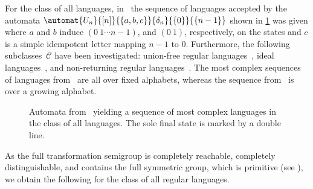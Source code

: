 For the class of all languages, in~\cite{DBLP:journals/ijfcs/Brzozowski13} the sequence of languages accepted
by the automata $\automat{U_n}{[n]}{\{a,b,c\}}{\delta_n}{\{0\}}{\{n-1\}}$
shown in \cref{syncmax:fig:most-complex-all-lang} was given
where $a$ and $b$ induce $(0 ~ 1 \cdots n - 1)$,
and $(0 ~ 1)$, respectively, on the states
and $c$ is a simple idempotent letter mapping $n-1$ to $0$.
Furthermore, the following subclasses~$\mathcal C$ have
been investigated: union-free regular languages~\cite{DBLP:conf/dcfs/BrzozowskiD18},
ideal languages~\cite{DBLP:journals/dmtcs/BrzozowskiDL16}, and non-returning regular languages~\cite{brzozowski2019most}.
The most complex sequences of languages from~\cite{DBLP:journals/ijfcs/Brzozowski13,DBLP:conf/dcfs/BrzozowskiD18,DBLP:journals/dmtcs/BrzozowskiDL16} 
are all over fixed alphabets, whereas the sequence from~\cite{brzozowski2019most} is over a growing alphabet.

\begin{figure}[ht]
	\centering 	
	\caption[Sequence of most complex languages]{Automata from~\cite{DBLP:journals/ijfcs/Brzozowski13} yielding a sequence of most complex languages in the class of all languages. The sole final state is marked by a double line.}
	\label{syncmax:fig:most-complex-all-lang}
\end{figure}

As the full transformation semigroup is completely reachable, completely distinguishable,
and contains the full symmetric group, which is primitive (see ),
we obtain the following for the class of all regular languages.

